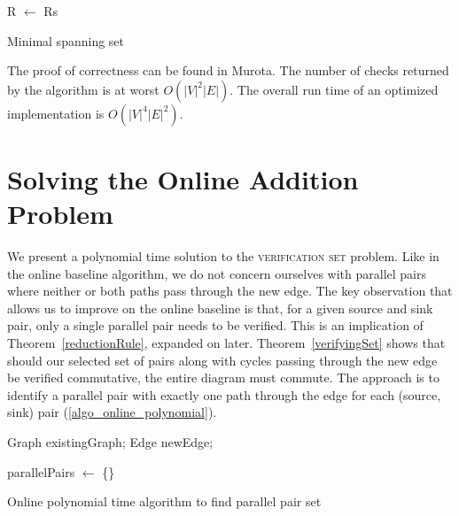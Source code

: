 \documentclass[sigplan,review,anonymous]{acmart}
\begin{document}
{\begin{algorithm}
R $\gets$ Rs\;
\;

\caption{Minimal spanning set}\label{algo_minimal_spanning_set}
\end{algorithm}

The proof of correctness can be found in Murota\cite{commutative}.
The number of checks returned by the algorithm is at worst $O(|V|^2|E|)$. The overall run time of an optimized implementation is $O(|V|^4|E|^2)$.

\section{Solving the Online Addition Problem}

We present a polynomial time solution to the \textsc{verification set} problem.
Like in the online baseline algorithm, we do not concern ourselves with parallel pairs where neither or both paths pass through the new edge.
The key observation that allows us to improve on the online baseline is that, for a given source and sink pair, only a single parallel pair needs to be verified.
This is an implication of Theorem~\ref{reductionRule}, expanded on later.
Theorem~\ref{verifyingSet} shows that should our selected set of pairs along with cycles passing through the new edge be verified commutative, the entire diagram must commute.
The approach is to identify a parallel pair with exactly one path through the edge for each (source, sink) pair (\ref{algo_online_polynomial}).

\begin{algorithm}
\DontPrintSemicolon
{}
Graph existingGraph;
Edge newEdge;

parallelPairs $\gets$ \{\}\;
\;
\caption{Online polynomial time algorithm to find parallel pair set}
\label{algo_online_polynomial}
\end{algorithm}

}
\end{document}

